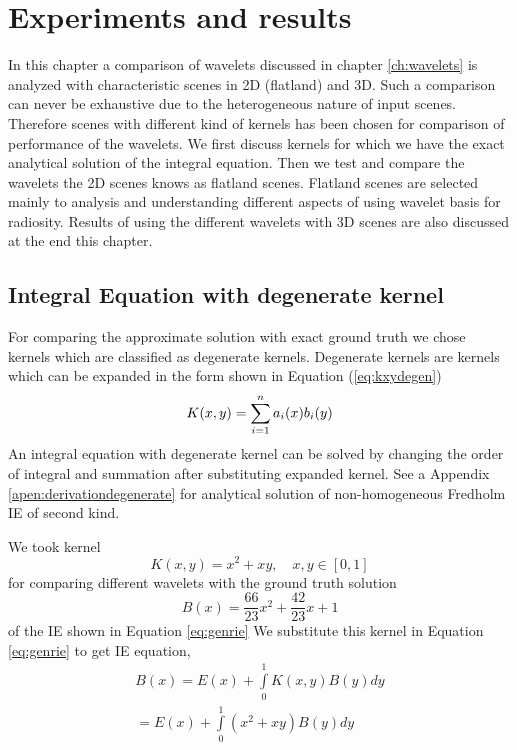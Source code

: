 \chapter{\label{ch:experimentandresult}Experiments and results}
In this chapter a comparison of wavelets discussed in chapter  \ref{ch:wavelets} is analyzed with characteristic scenes in 2D (flatland) and 3D. Such a comparison can never be exhaustive due to the heterogeneous nature of input scenes. Therefore scenes with different kind of kernels has been chosen for comparison of performance of the wavelets. We first discuss kernels for which we have the exact analytical solution of the integral equation. Then we test and compare the wavelets the 2D scenes knows as flatland scenes. Flatland scenes are selected mainly to analysis and understanding different aspects of using wavelet basis for radiosity. Results of using the different wavelets with 3D scenes are also discussed at the end this chapter. \\

\section{Integral Equation with degenerate kernel}
For comparing the approximate solution with exact ground truth we chose kernels which are classified as degenerate kernels. Degenerate kernels are kernels which can be expanded in the form shown in Equation (\ref{eq:kxydegen})
\begin{equation} \label{eq:kxydegen}
K(x,y) = \sum\limits_{i=1}^na_i(x)b_i(y) \\ 
\end{equation}
An integral equation with degenerate kernel can be solved by changing the order of integral and summation after substituting expanded kernel. See a
Appendix \ref{apen:derivationdegenerate} for analytical solution of non-homogeneous Fredholm IE of second kind. 

We took kernel 
\begin{equation}\label{eq:kernelanalytical}
 K(x,y)=x^2+xy, \quad x,y \in [0,1]
\end{equation}
for comparing different wavelets with the ground truth solution 
\begin{equation}\label{eq:solutinoanalytical}
    B(x)=\frac{66}{23}x^2+\frac{42}{23}x+1
\end{equation}
 of the IE shown in Equation \ref{eq:genrie}
 We substitute this kernel in Equation \ref{eq:genrie} to get IE equation,
\begin{eqnarray} \label{eq:analytical}
B(x)=E(x)+\int\limits_0^1 K(x,y)B(y) dy \\
 = E(x)+\int\limits_0^1 (x^2+xy )B(y) dy
\end{eqnarray}


